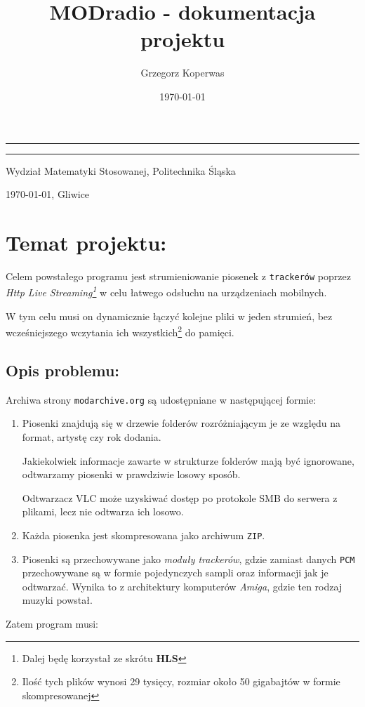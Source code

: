 \documentclass[a4paper,12pt]{article}
\title{MODradio - dokumentacja projektu}
\author{Grzegorz Koperwas}
\date{\today}
\renewcommand{\maketitle}{
    \begin{titlepage}
        \vspace*{2cm}
        
        \hspace{-3.4cm}\begin{minipage}{13cm}
            \hrule

            \vspace*{10pt}

            \hspace{15mm}\Large{\textbf{\thetitle}}

            \vspace*{5mm}

            \hspace{15mm}\large{\theauthor}

            \vspace*{10pt}

            \hrule
        \end{minipage}


        \vfill
    
        \begin{center}
            \footnotesize 
            Wydział Matematyki Stosowanej, Politechnika Śląska 
            
            \vspace*{1em}

            \today, Gliwice
        \end{center}
            
        \vspace*{1cm}
        
    \end{titlepage}
}
\begin{document}
\maketitle

\section{Temat projektu:}

Celem powstałego programu jest strumieniowanie piosenek z \texttt{trackerów}
poprzez \emph{Http Live Streaming\footnote{Dalej będę korzystał ze skrótu
\textbf{HLS}}} w celu łatwego odsłuchu na urządzeniach
mobilnych.

W tym celu musi on dynamicznie łączyć kolejne pliki w jeden strumień, bez
wcześniejszego wczytania ich wszystkich\footnote{Ilość tych plików wynosi 29 tysięcy,
rozmiar około 50 gigabajtów w formie skompresowanej} do pamięci.

\subsection*{Opis problemu:}

Archiwa strony \texttt{modarchive.org} są udostępniane w następującej formie:

\begin{enumerate}
        \item Piosenki znajdują się w drzewie folderów rozróżniającym je ze
            względu na format, artystę czy rok dodania. 

            Jakiekolwiek informacje zawarte w strukturze folderów mają być
            ignorowane, odtwarzamy piosenki w prawdziwie losowy sposób.

            Odtwarzacz VLC
            może uzyskiwać dostęp po protokole SMB do serwera z plikami, lecz
            nie odtwarza ich losowo.

        \item Każda piosenka jest skompresowana jako archiwum \texttt{ZIP}.

        \item Piosenki są przechowywane jako \emph{moduły trackerów}, gdzie
            zamiast danych \texttt{PCM} przechowywane są w formie pojedynczych
            sampli oraz informacji jak je odtwarzać. Wynika to z architektury
            komputerów \emph{Amiga}, gdzie ten rodzaj muzyki powstał.
\end{enumerate}

Zatem program musi:
\end{document}
